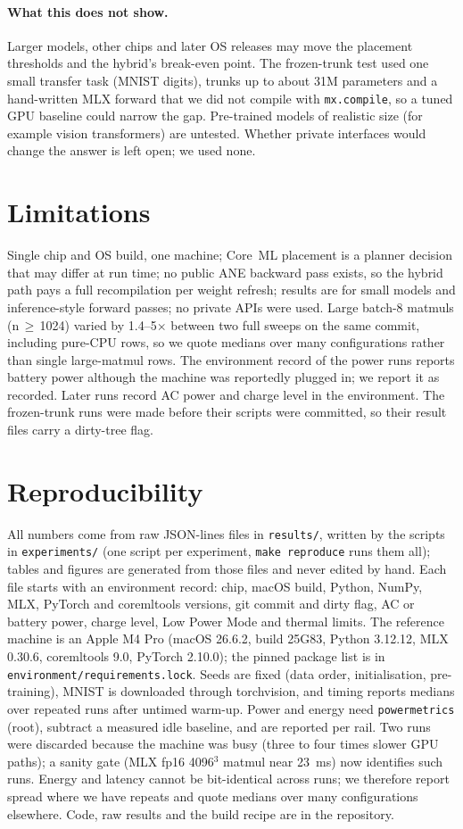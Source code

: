 \documentclass[11pt]{article}
\begin{document}
\paragraph{What this does not show.} Larger models, other chips and later OS
releases may move the placement thresholds and the hybrid's break-even point.
The frozen-trunk test used one small transfer task (MNIST digits), trunks up to
about 31M parameters and a hand-written MLX forward that we did not compile with
\texttt{mx.compile}, so a tuned GPU baseline could narrow the gap. Pre-trained
models of realistic size (for example vision transformers) are untested.
Whether private interfaces would change the answer is left open; we used none.

\section{Limitations}\label{sec:limits}
Single chip and OS build, one machine; Core~ML placement is a planner decision that may differ
at run time; no public ANE backward pass exists, so the hybrid path pays a full
recompilation per weight refresh; results are for small models and
inference-style forward passes; no private APIs were used. Large batch-8 matmuls (n\,$\ge$\,1024) varied by 1.4--5$\times$ between two full sweeps on the same commit, including pure-CPU rows, so we quote medians over many configurations rather than single large-matmul rows. The environment record of the power runs reports battery power although the machine was reportedly plugged in; we report it as recorded. Later runs record AC power and charge level in the environment. The frozen-trunk runs were made before their scripts were committed, so their result files carry a dirty-tree flag.

\section{Reproducibility}
All numbers come from raw JSON-lines files in \texttt{results/}, written by the
scripts in \texttt{experiments/} (one script per experiment, \texttt{make reproduce}
runs them all); tables and figures are generated from those files and never
edited by hand. Each file starts with an environment record: chip, macOS
build, Python, NumPy, MLX, PyTorch and coremltools versions, git commit and
dirty flag, AC or battery power, charge level, Low Power Mode and thermal
limits. The reference machine is an Apple M4 Pro (macOS 26.6.2, build 25G83,
Python 3.12.12, MLX 0.30.6, coremltools 9.0, PyTorch 2.10.0); the pinned package
list is in \texttt{environment/requirements.lock}. Seeds are fixed (data order,
initialisation, pre-training), MNIST is downloaded through torchvision, and timing
reports medians over repeated runs after untimed warm-up. Power and energy need
\texttt{powermetrics} (root), subtract a measured idle baseline, and are
reported per rail. Two runs were discarded because the machine was busy
(three to four times slower GPU paths); a sanity gate (MLX fp16 4096$^3$ matmul
near 23~ms) now identifies such runs. Energy and latency cannot be bit-identical
across runs; we therefore report spread where we have repeats and quote medians
over many configurations elsewhere. Code, raw results and the build recipe are in
the repository.



\end{document}
